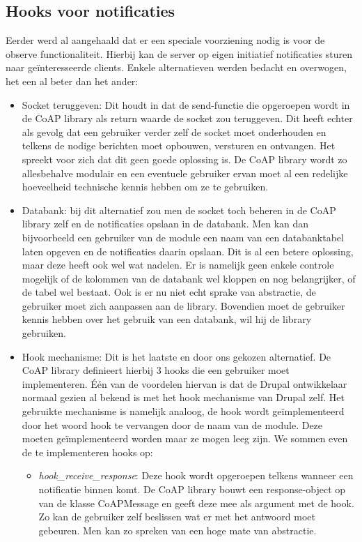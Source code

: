 \subsection{Hooks voor notificaties} \label{observe_hooks}

Eerder werd al aangehaald dat er een speciale voorziening nodig is voor de observe functionaliteit. Hierbij kan de server op eigen initiatief notificaties sturen naar ge\"{i}nteresseerde clients. Enkele alternatieven werden bedacht en overwogen, het een al beter dan het ander:
\begin{itemize}
\item Socket teruggeven: Dit houdt in dat de send-functie die opgeroepen wordt in de CoAP library als return waarde de socket zou teruggeven. Dit heeft echter als gevolg dat een gebruiker verder zelf de socket moet onderhouden en telkens de nodige berichten moet opbouwen, versturen en ontvangen. Het spreekt voor zich dat dit geen goede oplossing is. De CoAP library wordt zo allesbehalve modulair en een eventuele gebruiker ervan moet al een redelijke hoeveelheid technische kennis hebben om ze te gebruiken.
\item Databank: bij dit alternatief zou men de socket toch beheren in de CoAP library zelf en de notificaties opslaan in de databank. Men kan dan bijvoorbeeld een gebruiker van de module een naam van een databanktabel laten opgeven en de notificaties daarin opslaan. Dit is al een betere oplossing, maar deze heeft ook wel wat nadelen. Er is namelijk geen enkele controle mogelijk of de kolommen van de databank wel kloppen en nog belangrijker, of de tabel wel bestaat. Ook is er nu niet echt sprake van abstractie, de gebruiker moet zich aanpassen aan de library. Bovendien moet de gebruiker kennis hebben over het gebruik van een databank, wil hij de library gebruiken.
\item Hook mechanisme: Dit is het laatste en door ons gekozen alternatief. De CoAP library definieert hierbij 3 hooks die een gebruiker moet implementeren. \'{E}\'{e}n van de voordelen hiervan is dat de Drupal ontwikkelaar normaal gezien al bekend is met het hook mechanisme van Drupal zelf. Het gebruikte mechanisme is namelijk analoog, de hook wordt ge\"{i}mplementeerd door het woord hook te vervangen door de naam van de module. Deze moeten ge\"{i}mplementeerd worden maar ze mogen leeg zijn. We sommen even de te implementeren hooks op:
\begin{itemize}
\item \textit{hook\_receive\_response}: Deze hook wordt opgeroepen telkens wanneer een notificatie binnen komt. De CoAP library bouwt een response-object op van de klasse CoAPMessage en geeft deze mee als argument met de hook. Zo kan de gebruiker zelf beslissen wat er met het antwoord moet gebeuren. Men kan zo spreken van een hoge mate van abstractie.

\end{itemize}
\end{itemize}
